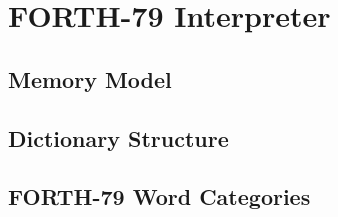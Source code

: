 
\chapter{FORTH-79 Interpreter}
\label{vol1:chap:interpreter}


\section{Memory Model}
\label{vol1:sec:interp:memory}


\section{Dictionary Structure}
\label{vol1:sec:interp:dictionary}


\section{FORTH-79 Word Categories}
\label{vol1:sec:interp:words}


